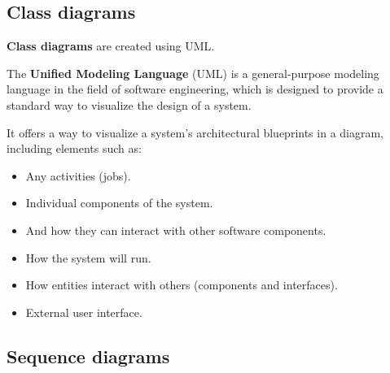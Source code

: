 \documentclass[12pt]{report}
\renewcommand\emph{\textbf}
\begin{document}
                \newpage
                \newpage

            \subsection{Class diagrams}

                \emph{Class diagrams} are created using UML.

                The \emph{Unified Modeling Language} (UML) is a general-purpose modeling language in the field of software engineering, which is designed to provide a standard way to visualize the design of a system.

                It offers a way to visualize a system's architectural blueprints in a diagram, including elements such as:

                \begin{itemize}
                    \item Any activities (jobs).
                    \item Individual components of the system.
                    \item And how they can interact with other software components.
                    \item How the system will run.
                    \item How entities interact with others (components and interfaces).
                    \item External user interface.
                \end{itemize}


                \newpage


                \newpage
                \newpage

            \subsection{Sequence diagrams}
\end{document}
